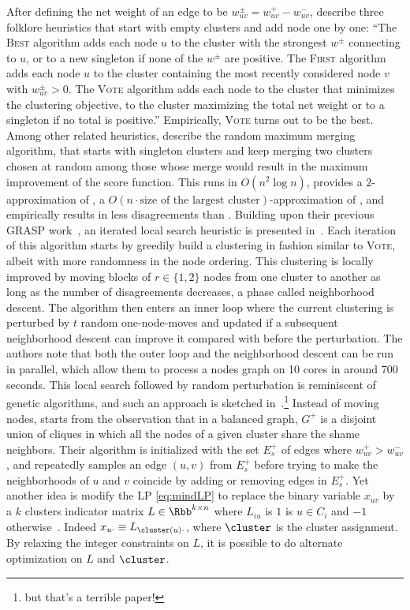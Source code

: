 After defining the net weight of an edge to be $w^\pm_{uv} = w^+_{uv} - w^-_{uv}$,
\textcite{Elsner2009} describe three folklore heuristics that start with empty clusters and add node
one by one: \enquote{The \textsc{Best} algorithm adds each node $u$ to the cluster with the
strongest $w^\pm$ connecting to $u$, or to a new singleton if none of the $w^\pm$ are positive.
The \textsc{First} algorithm adds each node $u$ to the cluster containing the most recently
considered node $v$ with $w^\pm_{uv} > 0$. The \textsc{Vote} algorithm adds each node to the cluster
that minimizes the \pcc{} clustering objective, \ie{} to the cluster maximizing the total net weight
or to a singleton if no total is positive.} Empirically, \textsc{Vote} turns out to be the best.
Among other related heuristics, \textcite{mergingHeuristics14} describe the random maximum merging
algorithm, that starts with singleton clusters and keep merging two clusters chosen at random among
those whose merge would result in the maximum improvement of the score function.  This runs in
$O(n^2\log n)$, provides a $2$-approximation of \maxa{}, a $O(n\cdot \text{size of the largest
cluster})$-approximation of \mind{}, and empirically results in less disagreements than \ccpivot{}.
Building upon their previous GRASP work~\autocite{GRASP13}, an iterated local search heuristic is
presented in~\autocites{Levorato2015}{Levorato2017}. Each iteration of this algorithm starts by
greedily build a clustering in fashion similar to \textsc{Vote}, albeit with more randomness in the
node ordering. This clustering is locally improved by moving blocks of $r\in\{1,2\}$ nodes from one
cluster to another as long as the number of disagreements decreases, a phase called neighborhood
descent. The algorithm then enters an inner loop where the current clustering is perturbed by $t$
random one-node-moves and updated if a subsequent neighborhood descent can improve it compared with
before the perturbation. The authors note that both the outer loop and the neighborhood descent can
be run in parallel, which allow them to process a  nodes graph on 10 cores in around 700
seconds.
This local search followed by random perturbation is reminiscent of genetic algorithms, and such an
approach is sketched in~\autocite{GeneticCC08}.\footnote{but that's a terrible paper!} Instead of
moving nodes, \textcite{restoreNeighborhood13} starts from the observation that in a balanced
graph, $G^+$ is a disjoint union of cliques in which all the nodes of a given cluster share the shame
neighbors. Their algorithm is initialized with the set $E_s^+$ of edges where $w^+_{uv} > w^-_{uv}$,
and repeatedly samples an edge $(u,v)$ from $E_s^+$ before trying to make the neighborhoods of $u$
and $v$ coincide by adding or removing edges in $E_s^+$.  Yet another idea is modify the LP
\eqref{eq:mindLP} to replace the binary variable $x_{uv}$ by a $k$ clusters indicator matrix
$L\in\Rbb^{k\times n}$ where $L_{iu}$ is $1$ is $u\in C_i$ and $-1$
otherwise~\autocite{AltOptimLP13}. Indeed $x_{u\cdot} \equiv L_{\cluster(u)\cdot}$, where $\cluster$
is the cluster assignment. By relaxing the integer constraints on $L$, it is possible to do
alternate optimization on $L$ and $\cluster$.
